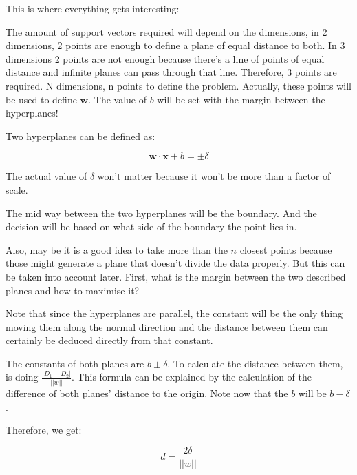 This is where everything gets interesting: 

 The amount of support vectors required will depend on the dimensions, in 2 dimensions, 2 points are enough to define a plane of equal distance to both. In 3 dimensions 2 points are not enough because there's a line of points of equal distance and infinite planes can pass through that line. Therefore, 3 points are required. N dimensions, n points to define the problem. Actually, these points will be used to define $\mathbf{w}$. The value of $b$ will be set with the margin between the hyperplanes!


Two hyperplanes can be defined as:

\begin{equation}
    \mathbf{w} \cdot \mathbf{x} + b = \pm \delta
\end{equation}

The actual value of $\delta$ won't matter because it won't be more than a factor of scale.

The mid way between the two hyperplanes will be the boundary. And the decision will be based on what side of the boundary the point lies in.




Also, may be it is a good idea to take more than the $n$ closest points because those might generate a plane that doesn't divide the data properly. But this can be taken into account later. First, what is the margin between the two described planes and how to maximise it?

Note that since the hyperplanes are parallel, the constant will be the only thing moving them along the normal direction and the distance between them can certainly be deduced directly from that constant.

The constants of both planes are $b \pm \delta$. To calculate the distance between them, is doing $\frac{\left| D_1 - D_2 \right|}{||w||}$. This formula can be explained by the calculation of the difference of both planes' distance to the origin. Note now that the $b$ will be $b-\delta$.

Therefore, we get:

\begin{equation}
    d = \frac{2 \delta}{||w||}
\end{equation}

